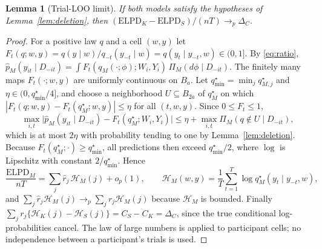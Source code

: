 \documentclass[11pt,letterpaper]{article}
\theoremstyle{plain}
\newtheorem{lemma}[theorem]{Lemma}
\theoremstyle{definition}
\begin{document}
\begin{lemma}[Trial-LOO limit]\label{lem:loolimit}
If both models satisfy the hypotheses of Lemma~\ref{lem:deletion}, then $(\mathrm{ELPD}_K-\mathrm{ELPD}_S)/(nT)\to_p\Delta_C$.
\end{lemma}
\begin{proof}
For a positive law $q$ and a cell $(w,y)$ let $F_t(q;w,y)=q(y\mid w)/q_{-t}(y_{-t}\mid w)=q(y_t\mid y_{-t},w)\in(0,1]$. By \eqref{eq:ratio}, $\widehat p_M(y_{it}\mid D_{-it})=\int F_t(q_M(\cdot;\phi);W_i,Y_i)\,\Pi_M(d\phi\mid D_{-it})$. The finitely many maps $F_t(\cdot;w,y)$ are uniformly continuous on $B_a$. Let $q^\star_{\min}=\min_jq^\star_{M,j}$ and $\eta\in(0,q^\star_{\min}/4]$, and choose a neighborhood $U\subseteq B_{2a}$ of $q^\star_M$ on which $|F_t(q;w,y)-F_t(q^\star_M;w,y)|\le\eta$ for all $(t,w,y)$. Since $0\le F_t\le1$,
\[
\max_{i,t}\bigl|\widehat p_M(y_{it}\mid D_{-it})-F_t(q^\star_M;W_i,Y_i)\bigr|\le\eta+\max_{i,t}\Pi_M(q\notin U\mid D_{-it}),
\]
which is at most $2\eta$ with probability tending to one by Lemma~\ref{lem:deletion}. Because $F_t(q^\star_M;\cdot)\ge q^\star_{\min}$, all predictions then exceed $q^\star_{\min}/2$, where $\log$ is Lipschitz with constant $2/q^\star_{\min}$. Hence
\[
\frac{\mathrm{ELPD}_M}{nT}=\sum_j\hat r_j\,\mathcal H_M(j)+o_p(1),\qquad
\mathcal H_M(w,y)=\frac1T\sum_{t=1}^T\log q^\star_M(y_t\mid y_{-t},w),
\]
and $\sum_j\hat r_j\mathcal H_M(j)\to_p\sum_jr_j\mathcal H_M(j)$ because $\mathcal H_M$ is bounded. Finally $\sum_jr_j\{\mathcal H_K(j)-\mathcal H_S(j)\}=C_S-C_K=\Delta_C$, since the true conditional log-probabilities cancel. The law of large numbers is applied to participant cells; no independence between a participant's trials is used.
\end{proof}
\end{document}
